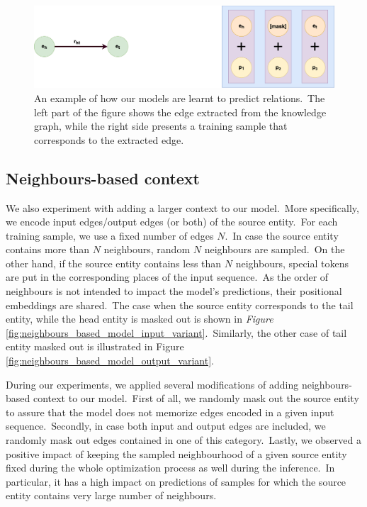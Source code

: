\documentclass[longabstract, english, mgr]{iithesis}
\theoremstyle{default_theorem_style}\newtheorem{theorem}{Theorem}
\theoremstyle{default_theorem_style}\newtheorem{definition}{Definition}
\begin{document}
\begin{figure}[h!]
\centering
\includegraphics[scale=0.25]{relation_based_model}
\caption{An example of how our models are learnt to predict relations.\ The left part of the figure shows the edge
extracted from the knowledge graph, while the right side presents a training sample that corresponds to the extracted
edge.}
\label{fig:relation_based_model}
\end{figure}

\subsection{Neighbours-based context}

We also experiment with adding a larger context to our model.\ More specifically, we encode input edges/output edges
(or both) of the source entity.\ For each training sample, we use a fixed number of edges $N$.\ In case the source
entity contains more than $N$ neighbours, random $N$ neighbours are sampled.\ On the other hand, if the source entity
contains less than $N$ neighbours, special tokens are put in the corresponding places of the input sequence.\ As the
order of neighbours is not intended to impact the model's predictions, their positional embeddings are shared.\ The case
when the source entity corresponds to the tail entity, while the head entity is masked out is shown
in \textit{Figure} \ref{fig:neighbours_based_model_input_variant}.\ Similarly, the other case of tail entity masked out
is illustrated in Figure \ref{fig:neighbours_based_model_output_variant}.\newline

\noindent During our experiments, we applied several modifications of adding neighbours-based context to our
model.\ First of all, we randomly mask out the source entity to assure that the model does not memorize edges encoded
in a given input sequence.\ Secondly, in case both input and output edges are included, we randomly mask out edges
contained in one of this category.\ Lastly, we observed a positive impact of keeping the sampled neighbourhood of
a given source entity fixed during the whole optimization process as well during the inference.\ In particular, it
has a high impact on predictions of samples for which the source entity contains very large number of neighbours.
\end{document}
